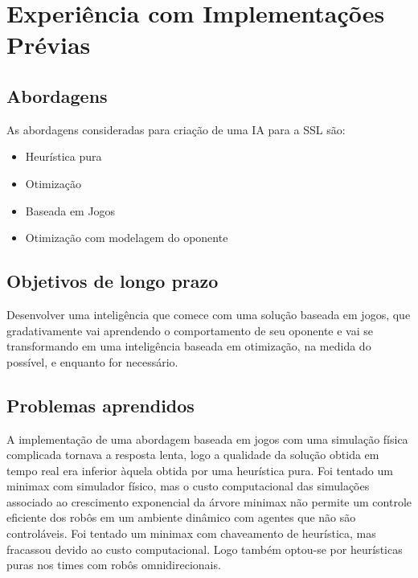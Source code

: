 \chapter{Experiência com Implementações Prévias}\label{cap:licoes_aprendidas}

\section{Abordagens}

As abordagens consideradas para criação de uma IA para a SSL são:
\begin{itemize}
 \item Heurística pura
 \item Otimização
 \item Baseada em Jogos
 \item Otimização com modelagem do oponente
\end{itemize}

\section{Objetivos de longo prazo}

Desenvolver uma inteligência que comece com uma solução baseada em jogos, que
gradativamente vai aprendendo o comportamento de seu oponente e vai se
transformando em uma inteligência baseada em otimização, na medida do possível,
e enquanto for necessário.

\section{Problemas aprendidos}

A implementação de uma abordagem baseada em jogos com uma simulação física
complicada tornava a resposta lenta, logo a qualidade da solução obtida em tempo
real era inferior àquela obtida por uma heurística pura.  Foi tentado um minimax
com simulador físico, mas o custo computacional das simulações associado ao
crescimento exponencial da árvore minimax não permite um controle eficiente dos
robôs em um ambiente dinâmico com agentes que não são controláveis.  Foi tentado
um minimax com chaveamento de heurística, mas fracassou devido ao custo
computacional. Logo também optou-se por heurísticas puras nos times com robôs
omnidirecionais.

